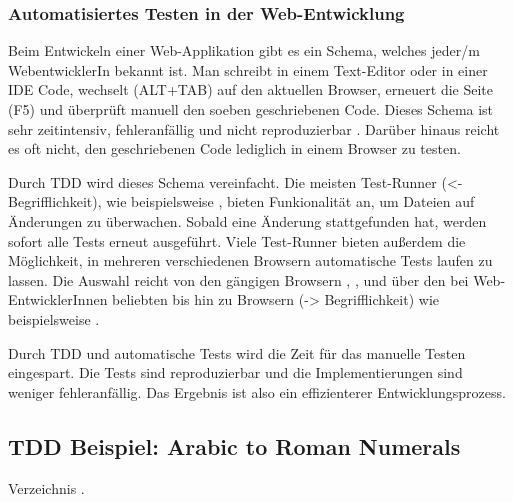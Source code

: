 \subsubsection{Automatisiertes Testen in der Web-Entwicklung}
Beim Entwickeln einer Web-Applikation gibt es ein Schema, welches jeder/m WebentwicklerIn bekannt ist. Man schreibt in einem Text-Editor oder in einer IDE Code, wechselt (ALT+TAB) auf den aktuellen Browser, erneuert die Seite (F5) und überprüft manuell den soeben geschriebenen Code. Dieses Schema ist sehr zeitintensiv, fehleranfällig und nicht reproduzierbar \autocite[3]{Johansen:2011}. Darüber hinaus reicht es oft nicht, den geschriebenen Code lediglich in einem Browser zu testen.

Durch TDD wird dieses Schema vereinfacht. Die meisten Test-Runner (<- Begrifflichkeit), wie beispielsweise , bieten Funkionalität an, um Dateien auf Änderungen zu überwachen. Sobald eine Änderung stattgefunden hat, werden sofort alle Tests erneut ausgeführt. Viele Test-Runner bieten außerdem die Möglichkeit, in mehreren verschiedenen Browsern automatische Tests laufen zu lassen. Die Auswahl reicht von den gängigen Browsern , ,  und  über den bei Web-EntwicklerInnen beliebten  bis hin zu  Browsern (-> Begrifflichkeit) wie beispielsweise .

Durch TDD und automatische Tests wird die Zeit für das manuelle Testen eingespart. Die Tests sind reproduzierbar und die Implementierungen sind weniger fehleranfällig. Das Ergebnis ist also ein effizienterer Entwicklungsprozess.

\subsection{TDD Beispiel: Arabic to Roman Numerals}
Verzeichnis .


